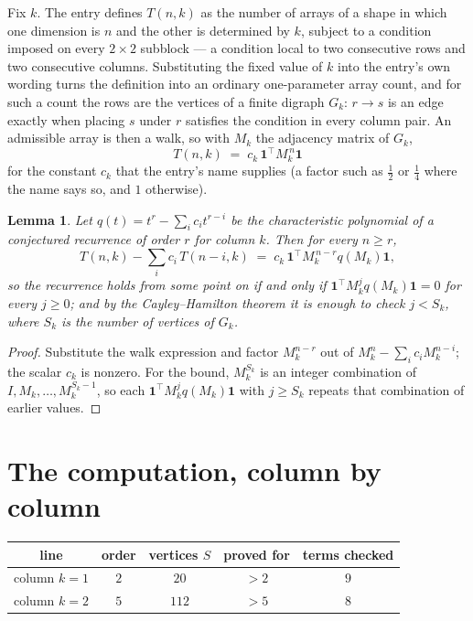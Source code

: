 \documentclass[11pt,a4paper]{article}
\theoremstyle{plain}
\newtheorem{lemma}[theorem]{Lemma}
\theoremstyle{definition}
\begin{document}
Fix $k$. The entry defines $T(n,k)$ as the number of arrays of a shape in which one dimension
is $n$ and the other is determined by $k$, subject to a condition imposed on every
$2\times2$ subblock --- a condition local to two consecutive rows and two consecutive columns.
Substituting the fixed value of $k$ into the entry's own wording turns the definition into an
ordinary one-parameter array count, and for such a count the rows are the vertices of a finite
digraph $G_k$: $r\to s$ is an edge exactly when placing $s$ under $r$ satisfies the condition
in every column pair. An admissible array is then a walk, so with $M_k$ the adjacency matrix
of $G_k$,
\[
T(n,k)\;=\;c_k\,\mathbf{1}^{\!\top}M_k^{\,n}\mathbf{1}
\]
for the constant $c_k$ that the entry's name supplies (a factor such as $\tfrac12$ or
$\tfrac14$ where the name says so, and $1$ otherwise).

\begin{lemma}\label{lem:crit}
Let $q(t)=t^{r}-\sum_i c_it^{r-i}$ be the characteristic polynomial of a conjectured
recurrence of order $r$ for column $k$. Then for every $n\ge r$,
\[
T(n,k)-\sum_i c_i\,T(n-i,k)\;=\;c_k\,\mathbf{1}^{\!\top}M_k^{\,n-r}q(M_k)\mathbf{1},
\]
so the recurrence holds from some point on if and only if
$\mathbf{1}^{\!\top}M_k^{j}q(M_k)\mathbf{1}=0$ for every $j\ge0$; and by the
Cayley--Hamilton theorem it is enough to check $j<S_k$, where $S_k$ is the number of vertices
of $G_k$.
\end{lemma}

\begin{proof}
Substitute the walk expression and factor $M_k^{n-r}$ out of $M_k^{n}-\sum_ic_iM_k^{n-i}$;
the scalar $c_k$ is nonzero. For the bound, $M_k^{S_k}$ is an integer combination of
$I,M_k,\dots,M_k^{S_k-1}$, so each $\mathbf{1}^{\!\top}M_k^{j}q(M_k)\mathbf{1}$ with
$j\ge S_k$ repeats that combination of earlier values.
\end{proof}

\section{The computation, column by column}

\begin{center}
\begin{tabular}{ccccc}
line & order & vertices $S$ & proved for & terms checked \\ \hline
column $k$$=1$ & $2$ & $20$ & $>2$ & $9$ \\
column $k$$=2$ & $5$ & $112$ & $>5$ & $8$ \\
\end{tabular}
\end{center}
\end{document}
